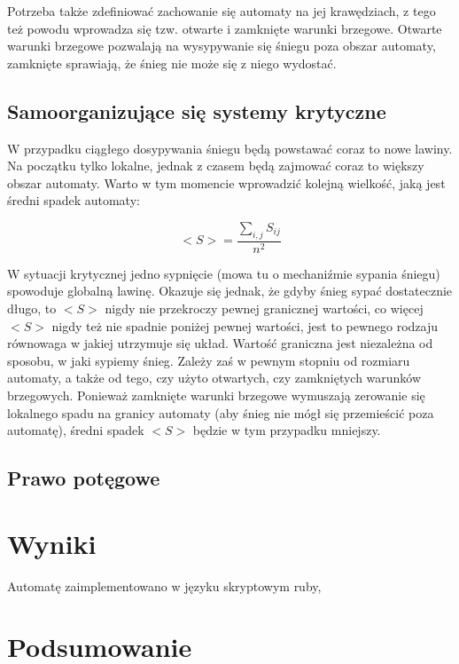 \documentclass{article}
\begin{document}
		Potrzeba także zdefiniować zachowanie się automaty na jej krawędziach, z tego też powodu wprowadza się tzw. otwarte i zamknięte warunki brzegowe. Otwarte warunki brzegowe pozwalają na 
		wysypywanie się śniegu poza obszar automaty, zamknięte sprawiają, że śnieg nie może się z niego wydostać. 
						
	\subsection{Samoorganizujące się systemy krytyczne}
		
		W przypadku ciągłego dosypywania śniegu będą powstawać coraz to nowe lawiny. Na początku tylko lokalne, jednak z czasem będą zajmować coraz to większy obszar automaty. Warto w tym momencie 
		wprowadzić kolejną wielkość, jaką jest średni spadek automaty: 

			\[ <S> = \frac{ \sum_{i, j}^{} S_{i j} }{n^2} \] 

		W sytuacji krytycznej jedno sypnięcie (mowa tu o mechaniźmie sypania śniegu) spowoduje globalną lawinę. Okazuje się jednak, że gdyby śnieg sypać dostatecznie długo, to $<S>$ nigdy nie przekroczy
		pewnej granicznej wartości, co więcej $<S>$ nigdy też nie spadnie poniżej pewnej wartości, jest to pewnego rodzaju równowaga w jakiej utrzymuje się układ. Wartość graniczna jest niezależna od sposobu, 
		w jaki sypiemy śnieg. Zależy zaś w pewnym stopniu od rozmiaru automaty, a także od tego, czy użyto otwartych, czy zamkniętych warunków brzegowych. Ponieważ zamknięte warunki brzegowe
		wymuszają zerowanie się lokalnego spadu na granicy automaty (aby śnieg nie mógł się przemieścić poza automatę), średni spadek $<S>$ będzie w tym przypadku mniejszy.
		
	\subsection{Prawo potęgowe}
		
\section{Wyniki}

	Automatę zaimplementowano w języku skryptowym ruby, 
\section{Podsumowanie}

	
\end{document}
